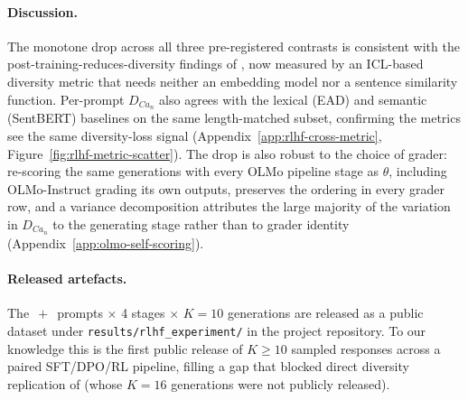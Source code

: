 \paragraph{Discussion.} The monotone drop across all three pre-registered contrasts is consistent with the post-training-reduces-diversity findings of \citet{kirk2023rlhf,padmakumar2023writingreduces}, now measured by an ICL-based diversity metric that needs neither an embedding model nor a sentence similarity function.
Per-prompt $D_{Ca_n}$ also agrees with the lexical (EAD) and semantic (SentBERT) baselines on the same length-matched subset, confirming the metrics see the same diversity-loss signal (Appendix~\ref{app:rlhf-cross-metric}, Figure~\ref{fig:rlhf-metric-scatter}).
The drop is also robust to the choice of grader: re-scoring the same generations with every OLMo pipeline stage as $\theta$, including OLMo-Instruct grading its own outputs, preserves the ordering in every grader row, and a variance decomposition attributes the large majority of the variation in $D_{Ca_n}$ to the generating stage rather than to grader identity (Appendix~\ref{app:olmo-self-scoring}).
\paragraph{Released artefacts.} The \olmoAlpacaN$\,+\,$\olmoNbCuratedN{} prompts $\times$ 4 stages $\times$ $K{=}10$ generations are released as a public dataset under \texttt{results/rlhf\_experiment/} in the project repository.
To our knowledge this is the first public release of $K\!\ge\!10$ sampled responses across a paired SFT/DPO/RL pipeline, filling a gap that blocked direct diversity replication of \citet{kirk2023rlhf} (whose $K{=}16$ generations were not publicly released).


